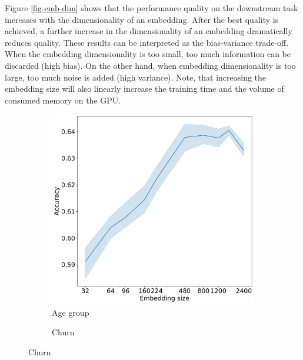 \documentclass[sigconf, anonymous]{acmart}
\begin{document}
Figure \ref{fig-emb-dim} shows that the performance quality on the downstream task increases with the dimensionality of an embedding. After the best quality is achieved, a further increase in the dimensionality of an embedding dramatically reduces quality.
These results can be interpreted as the bias-variance trade-off. When the embedding dimensionality is too small, too much information can be discarded (high bias). On the other hand, when embedding dimensionality is too large, too much noise is added (high variance).
Note, that increasing the embedding size will also linearly increase the training time and the volume of consumed memory on the GPU.

\begin{figure}
  \centering
  \caption{Embedding dimensionality vs. quality}
  \begin{subfigure}{0.25\linewidth}
    \caption{Age group}
    \includegraphics[width=\linewidth]{figures/hidden_size_age_pred.pdf}
  \end{subfigure}%
  \begin{subfigure}{0.25\linewidth}
    \caption{Churn}

\end{subfigure}
\end{figure}
\end{document}
